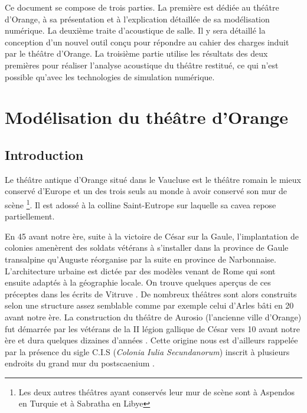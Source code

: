 Ce document se compose de trois parties. La première est dédiée au théâtre d'Or\-ange, à sa présentation et à l'explication détaillée de sa modélisation numérique. La deux\-ième traite d'acoustique de salle. Il y sera détaillé la conception d'un nouvel outil conçu pour répondre au cahier des charges induit par le théâtre d'Orange. La troisième partie utilise les résultats des deux premières pour réaliser l'analyse acoustique du théâtre restitué, ce qui n'est possible qu'avec les technologies de simulation numérique. 



\part{Modélisation du théâtre d’Orange} \label{part_1}

	\chapter*{Introduction}
	  \label{introarcheo}
	 
			 Le théâtre antique d'Orange situé dans le Vaucluse est le théâtre romain le mieux conservé d'Europe et un des trois seuls au monde à avoir conservé son mur de scène \footnote{Les deux autres théâtres ayant conservés leur mur de scène sont à Aspendos en Turquie et à Sabratha en Libye}. Il est adossé à la colline Saint-Eutrope sur laquelle sa \gls{cavea} repose partiellement.
			 
			 En 45 avant notre ère, suite à la victoire de César sur la Gaule, l'implantation de colonies amenèrent des soldats vétérans à s'installer dans la province de Gaule transalpine qu'Auguste réorganise par la suite en province de Narbonnaise. L'architecture urbaine est dictée par des modèles venant de Rome qui sont ensuite adaptés à la géographie locale. On trouve quelques aperçus de ces préceptes dans les écrits de Vitruve \cite[Livre V]{vitruve}. De nombreux théâtres sont alors construits selon une structure assez semblable comme par exemple celui d'Arles bâti en 20 avant notre ère. La construction du théâtre de Aurosio (l'ancienne ville d'Orange) fut démarrée par les vétérans de la II légion gallique de César vers 10 avant notre ère et dura quelques dizaines d'années \cite[p. 31]{PouvoirDuTheatre}. Cette origine nous est d'ailleurs rappelée par la présence du sigle C.I.S (\textit{Colonia Iulia Secundanorum}) inscrit à plusieurs endroits du grand mur du \gls{postscaenium} \cite[p26]{formige}.
			 
